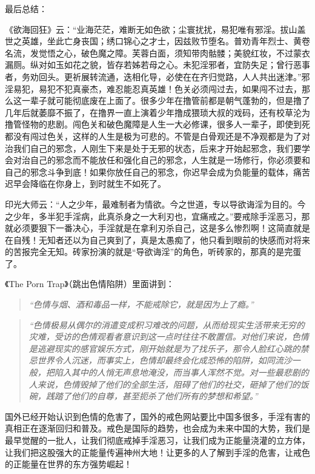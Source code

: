最后总结：

《欲海回狂》云：“业海茫茫，难断无如色欲；尘寰扰扰，易犯唯有邪淫。拔山盖世之英雄，坐此亡身丧国；绣口锦心之才士，因兹败节堕名。普劝青年烈士、黄卷名流，发觉悟之心，破色魔之障。芙蓉白面，须知带肉骷髅；美貌红妆，不过蒙衣漏厕。纵对如玉如花之貌，皆存若姊若母之心。未犯淫邪者，宜防失足；曾行恶事者，务劝回头。更祈展转流通，迭相化导，必使在在齐归觉路，人人共出迷津。”邪淫易犯，易犯不犯真豪杰，难忍能忍真英雄！色关必须闯过去，如果闯不过去，那么这一辈子就可能彻底废在上面了。很多少年在撸管前都是朝气蓬勃的，但是撸了几年后就萎靡不振了，在撸界一直上演着少年撸成猥琐大叔的戏码，还有校草沦为撸管怪物的悲剧。闯色关和破色魔障是人生一大必修课，很多人一辈子，即使到死都没有闯过色关，这样的人生是极为可悲的。不管是白骨观还是不净观都是为了对治我们自己的邪念，人刚生下来是处于无邪的状态，后来才开始起邪念，我们要学会对治自己的邪念而不能放任和强化自己的邪念，人生就是一场修行，你必须要和自己的邪念斗争到底！如果你放任自己的邪念，你迟早会成为负能量的载体，痛苦迟早会降临在你身上，到时就生不如死了。

印光大师云：“人之少年，最难制者为情欲。今之世道，专以导欲诲淫为目的。今之少年，多半犯手淫病，此真杀身之一大利刃也，宜痛戒之。”要戒除手淫恶习，那就必须要狠下一番决心，手淫就是在拿利刃杀自己，这是多么惨烈啊！这简直就是在自残！无知者还以为自己爽到了，真是太愚痴了，他只看到眼前的快感而对将来的苦报完全无知。砖家扮演的就是“导欲诲淫”的角色，听砖家的，那真的是完蛋了。

《The Porn Trap》（跳出色情陷阱）里面讲到：

\begin{quote}\it
    “色情与烟、酒和毒品一样，不能戒除它，就是因为上了瘾。”
\end{quote}

\begin{quote}\it
    “色情极易从偶尔的消遣变成积习难改的问题，从而给现实生活带来无穷的灾难，受访的色情观看者意识到这一点时往往不敢置信。对他们来说，色情是逃避现实的感官娱乐方式，刚开始就是为了找乐子，那令人脸红心跳的禁忌世界令人沉迷，而事实上，色情却最终会化成恐怖的陷阱，如同流沙一般，把陷入其中的人悄无声息地淹没，而当事人浑然不觉。对一些最悲剧的人来说，色情毁掉了他们的全部生活，阻碍了他们的社交，砸掉了他们的饭碗，践踏了他们的自尊，甚至扼杀了他们所有的梦想和希望。”
\end{quote}

国外已经开始认识到色情的危害了，国外的戒色网站要比中国多很多，手淫有害的真相正在逐渐回归和普及。戒色是国际的趋势，也会成为未来中国的大势，我们是最早觉醒的一批人，让我们彻底戒掉手淫恶习，让我们成为正能量浇灌的立方体，让我们把这股强大的正能量传遍神州大地！让更多的人了解到手淫的危害，让戒色的正能量在世界的东方强势崛起！

